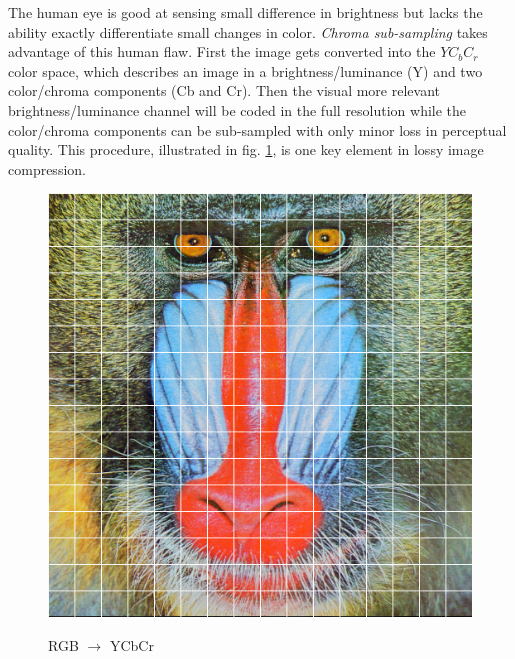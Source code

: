 The human eye is good at sensing small difference in brightness but lacks the
ability exactly differentiate small changes in color. \emph{Chroma sub-sampling}
takes advantage of this human flaw. First the image gets converted into the
$YC_bC_r$ color space, which describes an image in a brightness/luminance (Y)
and two color/chroma components (Cb and Cr). Then the visual more relevant
brightness/luminance channel will be coded in the full resolution while the
color/chroma components can be sub-sampled with only minor loss in perceptual
quality. This procedure, illustrated in fig. \ref{fig:YCbCr}, is one key element
in lossy image compression. 
\begin{figure}[h]
\centering
\includegraphics[scale = 0.25]{images/segmentation.png}
\label{fig:YCbCr}
\caption{RGB $\rightarrow$ YCbCr}
\end{figure}


